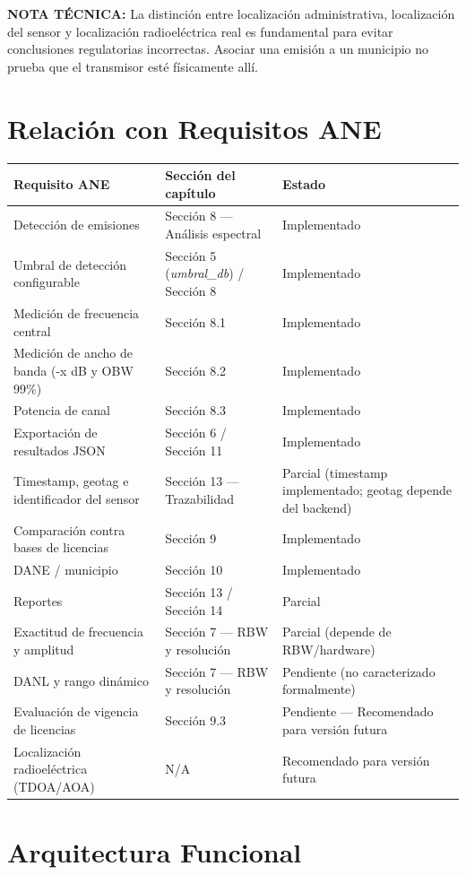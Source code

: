 \textbf{NOTA TÉCNICA:} La distinción entre localización administrativa, localización del sensor y localización radioeléctrica real es fundamental para evitar conclusiones regulatorias incorrectas. Asociar una emisión a un municipio no prueba que el transmisor esté físicamente allí.

\section{Relación con Requisitos ANE}

\begin{tabular}{p{6cm}p{4cm}p{4cm}}
\textbf{Requisito ANE} & \textbf{Sección del capítulo} & \textbf{Estado} \\
\hline
Detección de emisiones & Sección 8 — Análisis espectral & Implementado \\
Umbral de detección configurable & Sección 5 (\emph{umbral\_db}) / Sección 8 & Implementado \\
Medición de frecuencia central & Sección 8.1 & Implementado \\
Medición de ancho de banda (-x dB y OBW 99\%) & Sección 8.2 & Implementado \\
Potencia de canal & Sección 8.3 & Implementado \\
Exportación de resultados JSON & Sección 6 / Sección 11 & Implementado \\
Timestamp, geotag e identificador del sensor & Sección 13 — Trazabilidad & Parcial (timestamp implementado; geotag depende del backend) \\
Comparación contra bases de licencias & Sección 9 & Implementado \\
DANE / municipio & Sección 10 & Implementado \\
Reportes & Sección 13 / Sección 14 & Parcial \\
Exactitud de frecuencia y amplitud & Sección 7 — RBW y resolución & Parcial (depende de RBW/hardware) \\
DANL y rango dinámico & Sección 7 — RBW y resolución & Pendiente (no caracterizado formalmente) \\
Evaluación de vigencia de licencias & Sección 9.3 & Pendiente — Recomendado para versión futura \\
Localización radioeléctrica (TDOA/AOA) & N/A & Recomendado para versión futura \\
\end{tabular}

\section{Arquitectura Funcional}

